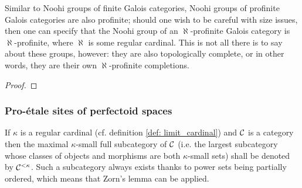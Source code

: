                     \begin{lemma} \label{lemma: profiniteness_of_noohi_groups_reprised}
                        Similar to Noohi groups of finite Galois categories, Noohi groups of profinite Galois categories are also profinite; should one wish to be careful with size issues, then one can specify that the Noohi group of an $\aleph$-profinite Galois category is $\aleph$-profinite, where $\aleph$ is some regular cardinal. This is not all there is to say about these groups, however: they are also topologically complete, or in other words, they are their own $\aleph$-profinite completions.
                    \end{lemma}
                        \begin{proof}
                            
                        \end{proof}
                        
                    \begin{proposition} \label{prop: pro_etale_galois_groups}
                        
                    \end{proposition}
                    
            \subsubsection{Pro-\'etale sites of perfectoid spaces} \label{subsubsection: pro_etale_sites_of_perfectoid_spaces}
                \begin{convention}
                    If $\kappa$ is a regular cardinal (cf. definition \ref{def: limit_cardinal}) and $\mathcal{C}$ is a category then the maximal $\kappa$-small full subcategory of $\mathcal{C}$ (i.e. the largest subcategory whose classes of objects and morphisms are both $\kappa$-small sets) shall be denoted by $\mathcal{C}^{< \kappa}$. Such a subcategory always exists thanks to power sets being partially ordered, which means that Zorn's lemma can be applied.
                \end{convention}
                
